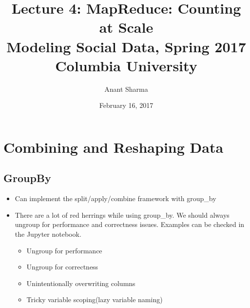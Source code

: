 \documentclass{article}
\title{
Lecture 4: MapReduce: Counting at Scale \\  %
Modeling Social Data, Spring 2017 \\   %
Columbia University                    %
}
\author{Anant Sharma}                     %
\date{February 16, 2017}                %
\begin{document}
\maketitle

\section{Combining and Reshaping Data}

\subsection{GroupBy}
\begin{itemize}
    \item Can implement the split/apply/combine framework with group\_by
    \item There are a lot of red herrings while using group\_by. We should always ungroup for performance and correctness issues. Examples can be checked in the Jupyter notebook.
    \begin{itemize}
        \item Ungroup for performance
        \item Ungroup for correctness
        \item Unintentionally overwriting columns
        \item Tricky variable scoping(lazy variable naming)
    \end{itemize}
\end{itemize}
\end{document}
